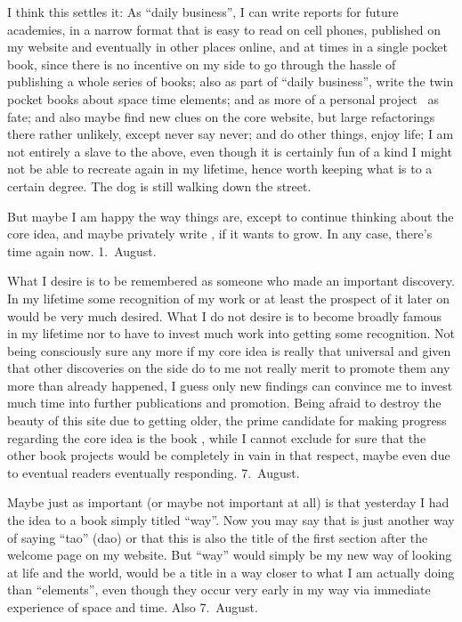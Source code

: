 \begin{itemize}
I think this settles it:
%
As “daily business”\hspace{-0.1em},
I can write reports for future academies,
in a narrow format that is easy to read on cell phones,
published on my website and eventually in other places online,
and at times in a single pocket book,
since there is no incentive on my side
to go through the hassle of publishing a whole series of books;
also as part of “daily business”\hspace{-0.1em},
write the twin pocket books about space time elements;
and as more of a personal project \ELEMENTAL\ as fate;
and also maybe find new clues on the core website,
but large refactorings there rather unlikely,
except never say never;
and do other things,
enjoy life;
I am not entirely a slave to the above,
even though it is certainly fun of a kind
I might not be able to recreate again in my lifetime,
hence worth keeping what is to a certain degree.
%
The dog is still walking down the street.

But maybe I am happy the way things are,
except to continue thinking about the core idea,
and maybe privately write \ELEMENTAL,
if it wants to grow.
%
In any case,
there’s time again now.
%
1.~August.

{\color{odyssey}%
What I desire is to be remembered as someone who made an important discovery.
%
In my lifetime some recognition of my work or at least the prospect of it later on would be very much desired.
%
What I do not desire is to become broadly famous in my lifetime
nor to have to invest much work into getting some recognition.
%
Not being consciously sure any more if my core idea is really that universal
and given that other discoveries on the side do to me not really merit
to promote them any more than already happened,
I guess only new findings can convince me
to invest much time into further publications and promotion.
%
Being afraid to destroy the beauty of this site due to getting older,
the prime candidate for making progress regarding the core idea is the book \ELEMENTAL,
while I cannot exclude for sure that the other book projects would be completely in vain in that respect,
maybe even due to eventual readers eventually responding.
%
7.~August.}

\newpage

Maybe just as important (or maybe not important at all)
is that yesterday I had the idea to a book simply titled “way”.
%
Now you may say that is just another way of saying “tao” (dao)
or that this is also the title of the first section after the welcome page on my website.
%
But “way” would simply be my new way of looking at life and the world,
would be a title in a way closer to what I am actually doing than “elements”,
even though they occur very early in my way
via immediate experience of space and time.
%
Also 7.~August.


\end{itemize}
